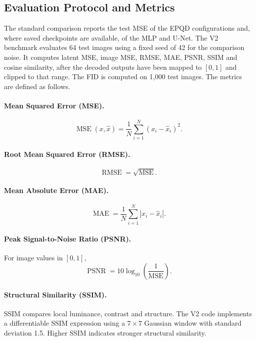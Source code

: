 \subsection{Evaluation Protocol and Metrics}
The standard comparison reports the test MSE of the EPQD configurations and, where saved checkpoints are available, of the MLP and U-Net. The V2 benchmark evaluates 64 test images using a fixed seed of 42 for the comparison noise. It computes latent MSE, image MSE, RMSE, MAE, PSNR, SSIM and cosine similarity, after the decoded outputs have been mapped to $[0,1]$ and clipped to that range. The FID is computed on 1{,}000 test images. The metrics are defined as follows.

\paragraph{Mean Squared Error (MSE).}
\begin{equation}
    \operatorname{MSE}(x,\hat x)
    =\frac{1}{N}\sum_{i=1}^{N}(x_i-\hat x_i)^2.
\end{equation}

\paragraph{Root Mean Squared Error (RMSE).}
\begin{equation}
    \operatorname{RMSE}=\sqrt{\operatorname{MSE}}.
\end{equation}

\paragraph{Mean Absolute Error (MAE).}
\begin{equation}
    \operatorname{MAE}=\frac{1}{N}\sum_{i=1}^{N}|x_i-\hat x_i|.
\end{equation}

\paragraph{Peak Signal-to-Noise Ratio (PSNR).}
For image values in $[0,1]$,
\begin{equation}
    \operatorname{PSNR}=10\log_{10}\left(\frac{1}{\operatorname{MSE}}\right).
\end{equation}

\paragraph{Structural Similarity (SSIM).}
SSIM compares local luminance, contrast and structure. The V2 code implements a differentiable SSIM expression using a $7\times7$ Gaussian window with standard deviation 1.5. Higher SSIM indicates stronger structural similarity.

